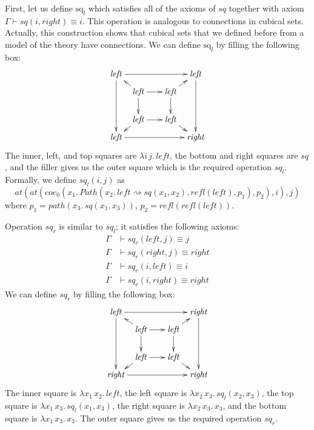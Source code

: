 \documentclass{mscs}
\newcommand{\deq}{\equiv}
\newcommand{\sqT}{\mathrm{sq}}
\newcommand{\refl}{\mathit{refl}}
\newcommand{\leftI}{\mathit{left}}
\newcommand{\rightI}{\mathit{right}}
\newcommand{\coe}{\mathit{coe}}
\newcommand{\sq}{\mathit{sq}}
\newcommand{\idtype}{\rightsquigarrow}
\newcommand{\Path}{\mathit{Path}}
\newcommand{\pathI}{\mathit{path}}
\newcommand{\at}{\mathit{at}}
\numberwithin{figure}{section}
\begin{document}
First, let us define $\sqT_l$ which satisfies all of the axioms of $\sq$ together with axiom $\Gamma \vdash \sq(i,\rightI) \deq i$.
This operation is analogous to connections in cubical sets.
Actually, this construction shows that cubical sets that we defined before from a model of the theory have connections.
We can define $\sqT_l$ by filling the following box:
\[ \xymatrix @C=0.5pc @R=0.5pc
    { \leftI \ar[rrrr] \ar[dddd] &            & &                        & \leftI \ar[dddd] \\
             & \leftI \ar[rr] \ar[dd] \ar[ul] & & \leftI \ar[dd] \ar[ur] & \\
             &                                & &                        & \\
             & \leftI \ar[rr] \ar[dl]         & & \leftI \ar[dr]         & \\
      \leftI \ar[rrrr]           &            & &                        & \rightI
    }\]
The inner, left, and top squares are $\lambda i\,j.\,\leftI$, the bottom and right squares are $\sq$,
and the filler gives us the outer square which is the required operation $\sq_l$.
Formally, we define $\sq_l(i,j)$ as
\[ \at(\at(\coe_0(x_1.\,\Path(x_2.\,\leftI \idtype \sq(x_1,x_2), \refl(\leftI), p_1), p_2),i),j) \]
where $p_1 = \pathI(x_3.\,\sq(x_1,x_3))$, $p_2 = \refl(\refl(\leftI))$.

Operation $\sq_r$ is similar to $\sq_l$; it satisfies the following axioms:
\begin{align*}
\Gamma & \vdash \sq_r(\leftI,j) \deq j \\
\Gamma & \vdash \sq_r(\rightI,j) \deq \rightI \\
\Gamma & \vdash \sq_r(i,\leftI) \deq i \\
\Gamma & \vdash \sq_r(i,\rightI) \deq \rightI
\end{align*}
We can define $sq_r$ by filling the following box:
\[ \xymatrix @C=0.5pc @R=0.5pc
    { \leftI \ar[rrrr] \ar[dddd] &            & &                        & \rightI \ar[dddd] \\
             & \leftI \ar[rr] \ar[dd] \ar[ul] & & \leftI \ar[dd] \ar[ur] & \\
             &                                & &                        & \\
             & \leftI \ar[rr] \ar[dl]         & & \leftI \ar[dr]         & \\
      \rightI \ar[rrrr]           &           & &                        & \rightI
    }\]
The inner square is $\lambda x_1\,x_2.\,\leftI$, the left square is $\lambda x_2\,x_3.\,\sq_l(x_2,x_3)$,
the top square is $\lambda x_1\,x_3.\,\sq_l(x_1,x_3)$, the right square is $\lambda x_2\,x_3.\,x_3$,
and the bottom square is $\lambda x_1\,x_3.\,x_3$.
The outer square gives us the required operation $\sq_r$.
\end{document}
